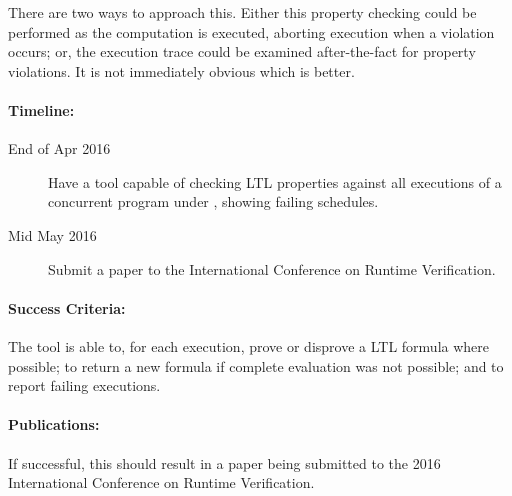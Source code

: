 There are two ways to approach this. Either this property checking
could be performed as the computation is executed, aborting execution
when a violation occurs; or, the execution trace could be examined
after-the-fact for property violations. It is not immediately obvious
which is better.

\paragraph{Timeline:}

\begin{description}
\item[End of Apr 2016] Have a tool capable of checking LTL properties
  against all executions of a concurrent program under \dejafu{},
  showing failing schedules.
\item[Mid May 2016] Submit a paper to the International Conference on
  Runtime Verification.
\end{description}

\paragraph{Success Criteria:}

The tool is able to, for each execution, prove or disprove a LTL
formula where possible; to return a new formula if complete evaluation
was not possible; and to report failing executions.

\paragraph{Publications:}

If successful, this should result in a paper being submitted to the
2016 International Conference on Runtime Verification.
